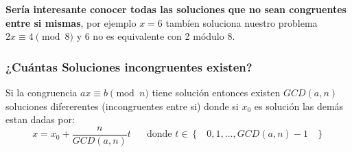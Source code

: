 \documentclass[12pt, fleqn]{report}                             %
\DeclareMathOperator \Space {\quad}                             %
\DeclareMathOperator \MiniSpace {\;}                            %
\newcommand{\Set}[1]{\left\{ \MiniSpace #1 \MiniSpace \right\}} %
\begin{document}
                \textbf{Sería interesante conocer todas las soluciones que no sean
                congruentes entre si mismas}, por ejemplo $x=6$ tambíen soluciona
                nuestro problema $2x \equiv 4 \pmod{8}$ y 6 no es equivalente con 2 módulo 8.


            \clearpage
            \subsubsection{¿Cuántas Soluciones incongruentes existen?}

                Si la congruencia $ax \equiv b \pmod{n}$ tiene solución entonces
                existen $GCD(a,n)$ soluciones difererentes (incongruentes entre si) donde
                si $x_0$ es solución las demás estan dadas por:
                \begin{equation*}
                    x = x_0 + \dfrac{n}{GCD(a,n)} t 
                        \Space\text{donde } t \in \Set{0, 1, \dots, GCD(a,n)-1}
                \end{equation*} 
\end{document}
